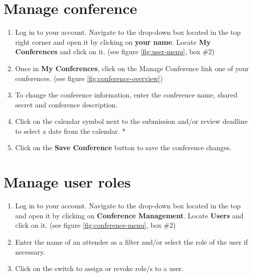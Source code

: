 \documentclass[nochapterpage,nopartpage,noheadingspace,numbersubsubsec,bigchapter,colorback,accentcolor=tud9c,10pt]{tudreport}
\begin{document}
	\section{Manage conference}


\begin{enumerate}
	\item	Log in to your account. Navigate to the drop-down box located in the top right corner and open it by clicking on \textbf{your name}. Locate \textbf{My Conferences} and click on it. (see figure \ref{fig:user-menu}, box \#2)
	\item	Once in \textbf{My Conferences}, click on the Manage Conference link one of your conferences. (see figure \ref{fig:conference-overview})
	\item	To change the conference information, enter the conference name, shared secret and conference description.
	\item	Click on the calendar symbol next to the submission and/or review deadline to select a date from the calendar. *
	\item	Click on the \textbf{Save Conference} button to save the conference changes.
\end{enumerate}

	\section{Manage user roles}


\begin{enumerate}
	\item	Log in to your account. Navigate to the drop-down box located in the top and open it by clicking on \textbf{Conference Management}. Locate \textbf{Users} and click on it. (see figure \ref{fig:conference-menu}, box \#2)
	\item	Enter the name of an attendee as a filter and/or select the role of the user if necessary.
	\item	Click on the switch to assign or revoke role/s to a user.
\end{enumerate}
\end{document}
